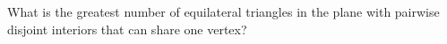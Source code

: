 What is the greatest number of equilateral triangles in the plane with pairwise disjoint interiors that can share one vertex?
